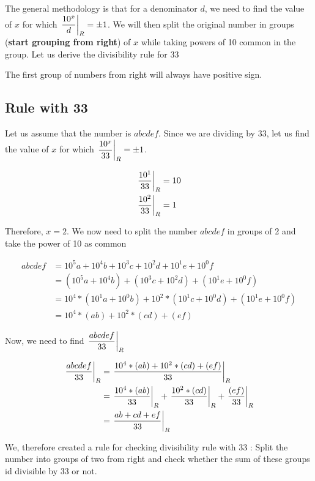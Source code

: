 The general methodology is that for a denominator $d$, we need to find the value of $x$ for which $\displaystyle{ \left. \frac{10^x}{d} \right |_{R} } = \pm1$. We will then split the original number in groups (\textbf{start grouping from right}) of $x$ while taking powers of 10 common in the group. Let us derive the divisibility rule for 33

\begin{NOTE}
    The first group of numbers from right will always have positive sign.
\end{NOTE}

\subsection{Rule with 33}

Let us assume that the number is $abcdef$. Since we are dividing by 33, let us find the value of $x$ for which $\displaystyle{ \left. \frac{10^x}{33} \right |_{R} } = \pm1$.

\begin{align*}
    \displaystyle{ \left. \frac{10^1}{33} \right |_{R} } &= 10 \\
    \displaystyle{ \left. \frac{10^2}{33} \right |_{R} } &= 1 \\
\end{align*}

Therefore, $x=2$. We now need to split the number $abcdef$ in groups of 2 and take the power of 10 as common

\begin{align*}
    abcdef &= 10^5a + 10^4b + 10^3c + 10^2d + 10^1e + 10^0f \\
    &= (10^5a + 10^4b) + (10^3c + 10^2d) + (10^1e + 10^0f) \tag{Grouping from right} \\
    &= 10^4 * (10^1a + 10^0b) + 10^2 * (10^1c + 10^0d) + (10^1e + 10^0f) \tag{Take powers of 10 common in groups} \\
    &= 10^4 * (ab) + 10^2 * (cd) + (ef) \tag{$lm$ is equivalent to $10^l + m$}  
\end{align*}

Now, we need to find $\displaystyle{ \left. \frac{abcdef}{33} \right |_{R} }$

\begin{align*}
    \displaystyle{ \left. \frac{abcdef}{33} \right |_{R} } &= \displaystyle{ \left. \frac{10^4 * (ab) + 10^2 * (cd) + (ef)}{33} \right |_{R} } \\
    &= \displaystyle{ \left. \frac{10^4 * (ab)}{33} \right |_{R} } + \displaystyle{ \left. \frac{10^2 * (cd)}{33} \right |_{R} } + \displaystyle{ \left. \frac{(ef)}{33} \right |_{R} } \\
    &= \displaystyle{ \left. \frac{ab + cd + ef}{33} \right |_{R} }
\end{align*}

We, therefore created a rule for checking divisibility rule with 33 : Split the number into groups of two from right and check whether the sum of these groups id divisible by 33 or not.

